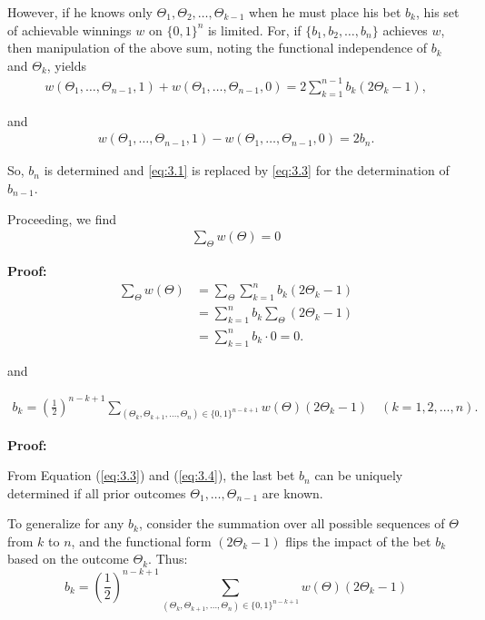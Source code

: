 \documentclass[11pt]{article}
\numberwithin{equation}{section}
\theoremstyle{boldStyle}
\begin{document}
However, if he knows only \(\Theta_1, \Theta_2, \ldots, \Theta_{k-1}\) when he must place his bet \(b_k\), his set of achievable winnings \(w\) on \(\{0, 1\}^n\) is limited. For, if \(\{b_1, b_2, \ldots, b_n\}\) achieves \(w\), then manipulation of the above sum, noting the functional independence of \(b_k\) and \(\Theta_k\), yields
\begin{align} \label{eq:3.3}
    w(\Theta_1, \ldots, \Theta_{n-1}, 1) + w(\Theta_1, \ldots, \Theta_{n-1}, 0) = 2 \sum_{k=1}^{n-1} b_k(2\Theta_k - 1),
\end{align}

and
\begin{align} \label{eq:3.4}
    w(\Theta_1, \ldots, \Theta_{n-1}, 1) - w(\Theta_1, \ldots, \Theta_{n-1}, 0) = 2b_n.
\end{align}

So, \(b_n\) is determined and \ref{eq:3.1} is replaced by \ref{eq:3.3} for the determination of \(b_{n-1}\). 

Proceeding, we find
\begin{align} \label{eq:3.5}
    \sum_{\Theta} w(\Theta) = 0
\end{align}

\textbf{Proof:}
\begin{align*}
    \sum_{\Theta} w(\Theta) &= \sum_{\Theta} \sum_{k=1}^n b_k(2\Theta_k - 1) \\
    &= \sum_{k=1}^n b_k \sum_{\Theta} (2\Theta_k - 1) \\
    &= \sum_{k=1}^n b_k \cdot 0 = 0.
\end{align*}

and 

\begin{align} \label{eq:3.6}
    b_k = (\frac{1}{2})^{n-k+1} \sum_{(\Theta_k, \Theta_{k+1}, \ldots, \Theta_n) \in \{0, 1\}^{n-k+1}} w(\Theta)(2\Theta_k - 1) \quad (k = 1, 2, \ldots, n).
\end{align}

\textbf{Proof:}

From Equation (\ref{eq:3.3}) and (\ref{eq:3.4}), the last bet \(b_n\) can be uniquely determined if all prior outcomes \(\Theta_1, \ldots, \Theta_{n-1}\) are known.

To generalize for any \(b_k\), consider the summation over all possible sequences of \(\Theta\) from \(k\) to \(n\), and the functional form \((2\Theta_k - 1)\) 
flips the impact of the bet \(b_k\) based on the outcome \(\Theta_k\). Thus:
\begin{equation*}
b_k = \left(\frac{1}{2}\right)^{n-k+1} \sum_{(\Theta_k, \Theta_{k+1}, \ldots, \Theta_n) \in \{0, 1\}^{n-k+1}} w(\Theta) (2\Theta_k - 1)
\end{equation*}
\end{document}
